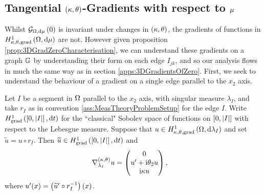 \subsection{Tangential $\left( \kappa, \theta \right)$-Gradients with respect to $\mu$} \label{apps:3DTangentialGradients}
Whilst $\mathcal{G}_{ \Omega, \mathrm{d}\mu}\left( 0 \right)$ is invariant under changes in $\left( \kappa, \theta \right)$, the gradients of functions in $H^1_{\kappa,\theta,\mathrm{grad}}\left( \Omega, \mathrm{d}\mu \right)$ are not.
However given proposition \ref{prop:3DGradZeroCharacterisation}, we can understand these gradients on a graph $\mathbb{G}$ by understanding their form on each edge $I_{jk}$, and so our analysis flows in much the same way as in section \ref{apps:3DGradientsOfZero}.
First, we seek to understand the behaviour of a gradient on a single edge parallel to the $x_2$ axis.

\begin{prop} \label{prop:3DTangGradSegment}
	Let $I$ be a segment in $\Omega$ parallel to the $x_2$ axis, with singular measure $\lambda_I$, and take $r_I$ as in convention \ref{ass:MeasTheoryProblemSetup} for the edge $I$.
	Write $H^1_\mathrm{grad}\left( \left[ 0,\left\lvert I \right\rvert \right], \mathrm{d}t \right)$ for the ``classical" Sobolev space of functions on $\left[ 0,\left\lvert I \right\rvert \right]$ with respect to the Lebesgue measure.
	Suppose that $u\in H^1_{\kappa,\theta,\mathrm{grad}}\left( \Omega, \mathrm{d}\lambda_I \right)$ and set $\widetilde{u} = u \circ r_I$.
	Then $\widetilde{u}\in H^1_\mathrm{grad}\left( \left[ 0,\left\lvert I \right\rvert \right], \mathrm{d}t \right)$ and
	\begin{align*}
		\nabla^{\left( \kappa, \theta \right)}_{\lambda_I} u &= 
		\begin{pmatrix} 0 \\ u' + \mathrm{i}\theta_2 u \\ \mathrm{i}\kappa u \end{pmatrix},
	\end{align*}
	where $u'(x) = \left( \widetilde{u}'\circ r_I^{-1} \right)(x)$.
\end{prop}
